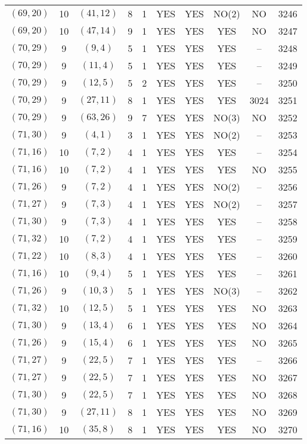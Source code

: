 \begin{longtable}{|c|c|c|c|c|c|c|c|c|c|}
$(69, 20)$ & 10 & $(41, 12)$ & 8 & 1 & YES & YES & NO(2) & NO & 3246\\
$(69, 20)$ & 10 & $(47, 14)$ & 9 & 1 & YES & YES & YES & NO & 3247\\
$(70, 29)$ & 9 & $(9, 4)$ & 5 & 1 & YES & YES & YES & -- & 3248\\
$(70, 29)$ & 9 & $(11, 4)$ & 5 & 1 & YES & YES & YES & -- & 3249\\
$(70, 29)$ & 9 & $(12, 5)$ & 5 & 2 & YES & YES & YES & -- & 3250\\
$(70, 29)$ & 9 & $(27, 11)$ & 8 & 1 & YES & YES & YES & 3024 & 3251\\
$(70, 29)$ & 9 & $(63, 26)$ & 9 & 7 & YES & YES & NO(3) & NO & 3252\\
$(71, 30)$ & 9 & $(4, 1)$ & 3 & 1 & YES & YES & NO(2) & -- & 3253\\
$(71, 16)$ & 10 & $(7, 2)$ & 4 & 1 & YES & YES & YES & -- & 3254\\
$(71, 16)$ & 10 & $(7, 2)$ & 4 & 1 & YES & YES & YES & NO & 3255\\
$(71, 26)$ & 9 & $(7, 2)$ & 4 & 1 & YES & YES & NO(2) & -- & 3256\\
$(71, 27)$ & 9 & $(7, 3)$ & 4 & 1 & YES & YES & NO(2) & -- & 3257\\
$(71, 30)$ & 9 & $(7, 3)$ & 4 & 1 & YES & YES & YES & -- & 3258\\
$(71, 32)$ & 10 & $(7, 2)$ & 4 & 1 & YES & YES & YES & -- & 3259\\
$(71, 22)$ & 10 & $(8, 3)$ & 4 & 1 & YES & YES & YES & -- & 3260\\
$(71, 16)$ & 10 & $(9, 4)$ & 5 & 1 & YES & YES & YES & -- & 3261\\
$(71, 26)$ & 9 & $(10, 3)$ & 5 & 1 & YES & YES & NO(3) & -- & 3262\\
$(71, 32)$ & 10 & $(12, 5)$ & 5 & 1 & YES & YES & YES & NO & 3263\\
$(71, 30)$ & 9 & $(13, 4)$ & 6 & 1 & YES & YES & YES & NO & 3264\\
$(71, 26)$ & 9 & $(15, 4)$ & 6 & 1 & YES & YES & YES & NO & 3265\\
$(71, 27)$ & 9 & $(22, 5)$ & 7 & 1 & YES & YES & YES & -- & 3266\\
$(71, 27)$ & 9 & $(22, 5)$ & 7 & 1 & YES & YES & YES & NO & 3267\\
$(71, 30)$ & 9 & $(22, 5)$ & 7 & 1 & YES & YES & YES & NO & 3268\\
$(71, 30)$ & 9 & $(27, 11)$ & 8 & 1 & YES & YES & YES & NO & 3269\\
$(71, 16)$ & 10 & $(35, 8)$ & 8 & 1 & YES & YES & YES & NO & 3270\\

\end{longtable}
